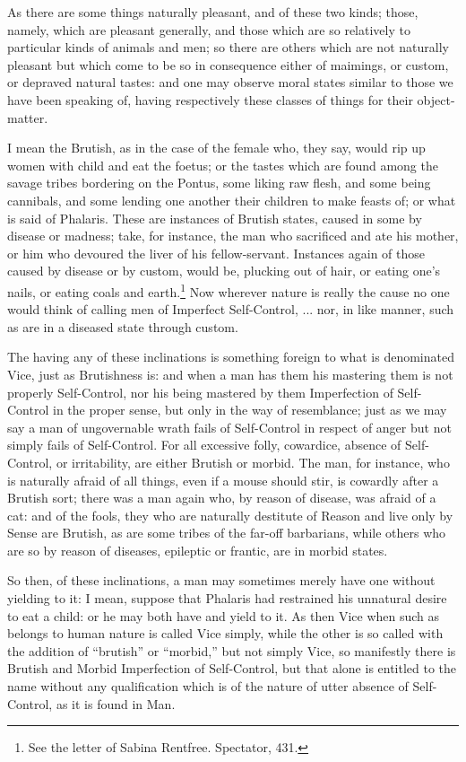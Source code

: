 As there are some things naturally pleasant, and of these two kinds; those,
namely, which are pleasant generally, and those which are so relatively to
particular kinds of animals and men; so there are others which are not
naturally pleasant but which come to be so in consequence either of maimings,
or custom, or depraved natural tastes: and one may observe moral states similar
to those we have been speaking of, having respectively these classes of things
for their object-matter.

I mean the Brutish, as in the case of the female who, they say, would rip up
women with child and eat the foetus; or the tastes which are found among the
savage tribes bordering on the Pontus, some liking raw flesh, and some being
cannibals, and some lending one another their children to make feasts of; or
what is said of Phalaris. These are instances of Brutish states, caused in some
by disease or madness; take, for instance, the man who sacrificed and ate his
mother, or him who devoured the liver of his fellow-servant. Instances again of
those caused by disease or by custom, would be, plucking out of hair, or eating
one’s nails, or eating coals and earth.\footnote{See the letter of Sabina Rentfree. Spectator, 431.}
Now wherever nature is really the cause no one would think of calling men of
Imperfect Self-Control, ... nor, in like manner, such as are in a diseased
state through custom.

The having any of these inclinations is something foreign to what is
denominated Vice, just as Brutishness is: and when a man has them his mastering
them is not properly Self-Control, nor his being mastered by them Imperfection
of Self-Control in the proper sense, but only in the way of resemblance; just
as we may say a man of ungovernable wrath fails of Self-Control in respect of
anger but not simply fails of Self-Control. For all excessive folly, cowardice,
absence of Self-Control, or irritability, are either Brutish or morbid. The
man, for instance, who is naturally afraid of all things, even if a mouse
should stir, is cowardly after a Brutish sort; there was a man again who, by
reason of disease, was afraid of a cat: and of the fools, they who are
naturally destitute of Reason and live only by Sense are Brutish, as are some
tribes of the far-off barbarians, while others who are so by reason of
diseases, epileptic or frantic, are in morbid states.

So then, of these inclinations, a man may sometimes merely have one without
yielding to it: I mean, suppose that Phalaris had restrained his unnatural
desire to eat a child: or he may both have and yield to it. As then Vice when
such as belongs to human nature is called Vice simply, while the other is so
called with the addition of “brutish” or “morbid,” but
not simply Vice, so manifestly there is Brutish and Morbid Imperfection of
Self-Control, but that alone is entitled to the name without any qualification
which is of the nature of utter absence of Self-Control, as it is found in Man.

